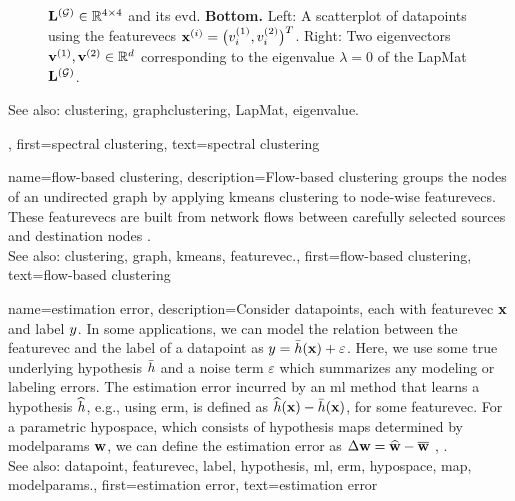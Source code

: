 {{\begin{figure}[H]
\begin{center}
{					${\bf L}^{(\mathcal{G})}  \in \mathbb{R}^{4 \times 4}$ and its \gls{evd}. 
					{\bf Bottom.} Left: A \gls{scatterplot} of \glspl{datapoint} using the \glspl{featurevec} 
					${\bf x}^{(i)} = \big( v^{(1)}_{i},v^{(2)}_{i} \big)^{T}$. 
					Right: Two \glspl{eigenvector} ${\bf v}^{(1)},{\bf v}^{(2)} \in \mathbb{R}^{d}$ 
					corresponding to the \gls{eigenvalue} $\lambda=0$ of the \gls{LapMat} ${\bf L}^{(\mathcal{G})}$. 
					} 
			\end{center}
		\end{figure}
		See also: \gls{clustering}, \gls{graphclustering},  \gls{LapMat}, \gls{eigenvalue}.
	\newpage}, 
	first={spectral clustering},
	text={spectral clustering} 
}

{name={flow-based clustering},
	description={Flow-based \gls{clustering} groups the nodes 
		of an undirected \gls{graph} by applying \gls{kmeans} \gls{clustering} to node-wise 
		\glspl{featurevec}. These \glspl{featurevec} are built from network flows between 
		carefully selected sources and destination nodes \cite{FlowSpecClustering2021}. 
					\\ 
		See also: \gls{clustering}, \gls{graph}, \gls{kmeans}, \gls{featurevec}.}, 
	first={flow-based clustering},
	text={flow-based clustering} 
}



{name={estimation error},
	description={Consider \glspl{datapoint}, each with \gls{featurevec} ${\bf x}$ and \gls{label} 
		$y$. In some applications, we can model the relation between the \gls{featurevec} and the \gls{label}
		of a \gls{datapoint} as $y = \bar{h}({\bf x}) + \varepsilon$. Here, we 
		use some true underlying \gls{hypothesis} $\bar{h}$ and a noise term $\varepsilon$ 
		which summarizes any modeling or labeling errors. The estimation error incurred by an \gls{ml} 
		method that learns a \gls{hypothesis} $\widehat{h}$, e.g., using \gls{erm}, is defined as 
		$\widehat{h}({\bf x}) - \bar{h}({\bf x})$, for some \gls{featurevec}. 
		For a parametric \gls{hypospace}, which consists of \gls{hypothesis} \glspl{map} determined by 
		\gls{modelparams} ${\bf w}$, we can define the estimation error as $\Delta {\bf w} = \widehat{{\bf w}} - \overline{{\bf w}}$ \cite{hastie01statisticallearning}, \cite{kay}.
					\\ 
		See also: \gls{datapoint}, \gls{featurevec}, \gls{label}, \gls{hypothesis}, \gls{ml}, \gls{erm}, \gls{hypospace}, \gls{map}, \gls{modelparams}.},
	first={estimation error},
	text={estimation error} 
}


